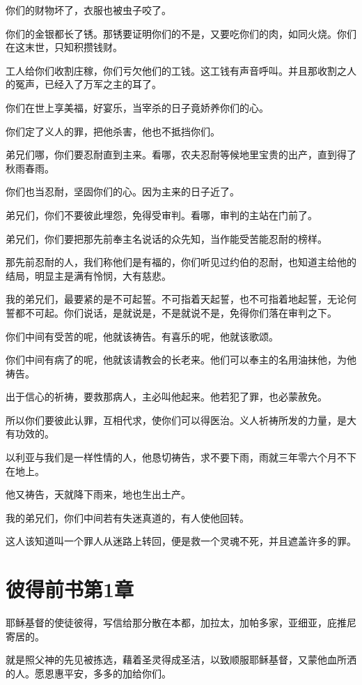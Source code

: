 \documentclass[12pt,oneside]{book}
\begin{document}
你们的财物坏了，衣服也被虫子咬了。

你们的金银都长了锈。那锈要证明你们的不是，又要吃你们的肉，如同火烧。你们在这末世，只知积攒钱财。

工人给你们收割庄稼，你们亏欠他们的工钱。这工钱有声音呼叫。并且那收割之人的冤声，已经入了万军之主的耳了。

你们在世上享美福，好宴乐，当宰杀的日子竟娇养你们的心。

你们定了义人的罪，把他杀害，他也不抵挡你们。

弟兄们哪，你们要忍耐直到主来。看哪，农夫忍耐等候地里宝贵的出产，直到得了秋雨春雨。

你们也当忍耐，坚固你们的心。因为主来的日子近了。

弟兄们，你们不要彼此埋怨，免得受审判。看哪，审判的主站在门前了。

弟兄们，你们要把那先前奉主名说话的众先知，当作能受苦能忍耐的榜样。

那先前忍耐的人，我们称他们是有福的，你们听见过约伯的忍耐，也知道主给他的结局，明显主是满有怜悯，大有慈悲。

我的弟兄们，最要紧的是不可起誓。不可指着天起誓，也不可指着地起誓，无论何誓都不可起。你们说话，是就说是，不是就说不是，免得你们落在审判之下。

你们中间有受苦的呢，他就该祷告。有喜乐的呢，他就该歌颂。

你们中间有病了的呢，他就该请教会的长老来。他们可以奉主的名用油抹他，为他祷告。

出于信心的祈祷，要救那病人，主必叫他起来。他若犯了罪，也必蒙赦免。

所以你们要彼此认罪，互相代求，使你们可以得医治。义人祈祷所发的力量，是大有功效的。

以利亚与我们是一样性情的人，他恳切祷告，求不要下雨，雨就三年零六个月不下在地上。

他又祷告，天就降下雨来，地也生出土产。

我的弟兄们，你们中间若有失迷真道的，有人使他回转。

这人该知道叫一个罪人从迷路上转回，便是救一个灵魂不死，并且遮盖许多的罪。

\chapter{彼得前书第1章}
耶稣基督的使徒彼得，写信给那分散在本都，加拉太，加帕多家，亚细亚，庇推尼寄居的。

就是照父神的先见被拣选，藉着圣灵得成圣洁，以致顺服耶稣基督，又蒙他血所洒的人。愿恩惠平安，多多的加给你们。
\end{document}
